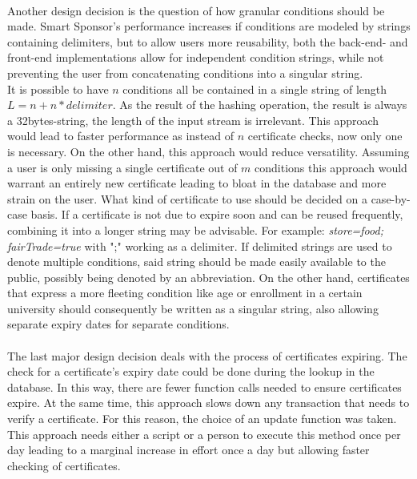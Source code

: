 \\
Another design decision is the question of how granular conditions should be made.
Smart Sponsor's performance increases if conditions are modeled by strings containing delimiters, but to allow users more reusability, both the back-end- and front-end implementations allow for independent condition strings, while not preventing the user from concatenating conditions into a singular string. \\
It is possible to have $n$ conditions all be contained in a single string of length $L = n + n*delimiter$. As the result of the hashing operation, the result is always a 32bytes-string, the length of the input stream is irrelevant. This approach would lead to faster performance as instead of $n$ certificate checks, now only one is necessary. On the other hand, this approach would reduce versatility. Assuming a user is only missing a single certificate out of $m$ conditions this approach would warrant an entirely new certificate leading to bloat in the database and more strain on the user. What kind of certificate to use should be decided on a case-by-case basis. If a certificate is not due to expire soon and can be reused frequently, combining it into a longer string may be advisable. For example: \emph{store=food; fairTrade=true} with ";" working as a delimiter. If delimited strings are used to denote multiple conditions, said string should be made easily available to the public, possibly being denoted by an abbreviation. On the other hand, certificates that express a more fleeting condition like age or enrollment in a certain university should consequently be written as a singular string, also allowing separate expiry dates for separate conditions.\\
\\
The last major design decision deals with the process of certificates expiring. The check for a certificate's expiry date could be done during the lookup in the database. In this way, there are fewer function calls needed to ensure certificates expire. At the same time, this approach slows down any transaction that needs to verify a certificate. For this reason, the choice of an update function was taken. This approach needs either a script or a person to execute this method once per day leading to a marginal increase in effort once a day but allowing faster checking of certificates.

